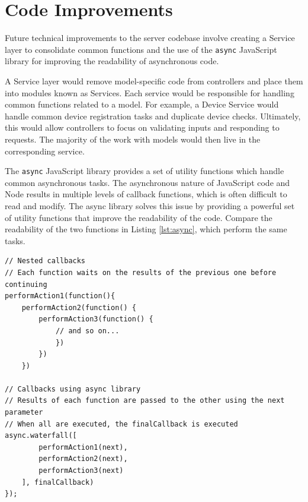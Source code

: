 \section{Code Improvements}

Future technical improvements to the server codebase involve creating a Service layer to consolidate common functions and the use of the \texttt{async} JavaScript library for improving the readability of asynchronous code. 

A Service layer would remove model-specific code from controllers and place them into modules known as Services. Each service would be responsible for handling common functions related to a model. For example, a Device Service would handle common device registration tasks and duplicate device checks. Ultimately, this would allow controllers to focus on validating inputs and responding to requests. The majority of the work with models would then live in the corresponding service.

The \texttt{async} JavaScript library provides a set of utility functions which handle common asynchronous tasks. The asynchronous nature of JavaScript code and Node results in multiple levels of callback functions, which is often difficult to read and modify. The async library solves this issue by providing a powerful set of utility functions that improve the readability of the code. Compare the readability of the two functions in Listing \ref{lst:async}, which perform the same tasks. 

\medskip
\begin{lstlisting}[caption=Comparison between normal callback code and async code, label={lst:async}]
// Nested callbacks
// Each function waits on the results of the previous one before continuing
performAction1(function(){
	performAction2(function() {
		performAction3(function() {
			// and so on...
			})
		})
	})

// Callbacks using async library
// Results of each function are passed to the other using the next parameter
// When all are executed, the finalCallback is executed
async.waterfall([
		performAction1(next), 
		performAction2(next),
		performAction3(next)
	], finalCallback)
});
\end{lstlisting}









